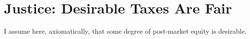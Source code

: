 


\section[Justice]{Justice: Desirable Taxes Are Fair} \label{sec:tax-justice} %
I assume here, axiomatically, that some degree of post-market  equity is desirable. %






